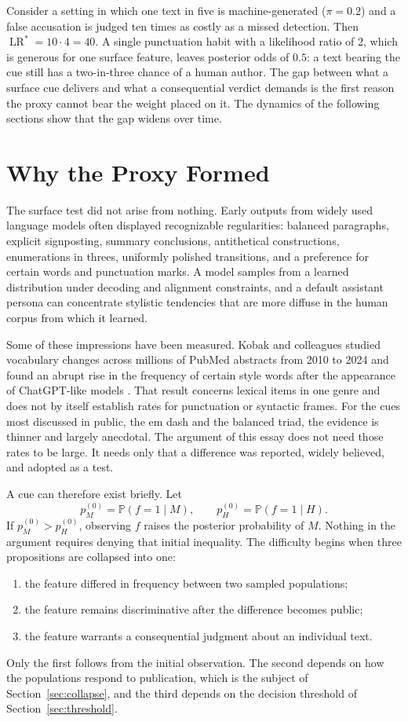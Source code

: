 \documentclass[11pt]{article}
\theoremstyle{plain}
\theoremstyle{definition}
\theoremstyle{remark}
\newcommand{\Pp}{\mathbb{P}}
\newcommand{\LR}{\operatorname{LR}}
\begin{document}
Consider a setting in which one text in five is machine-generated ($\pi=0.2$) and a false accusation is judged ten times as costly as a missed detection. Then $\LR^\ast = 10\cdot 4 = 40$. A single punctuation habit with a likelihood ratio of 2, which is generous for one surface feature, leaves posterior odds of $0.5$: a text bearing the cue still has a two-in-three chance of a human author. The gap between what a surface cue delivers and what a consequential verdict demands is the first reason the proxy cannot bear the weight placed on it. The dynamics of the following sections show that the gap widens over time.

\section{Why the Proxy Formed}

The surface test did not arise from nothing. Early outputs from widely used language models often displayed recognizable regularities: balanced paragraphs, explicit signposting, summary conclusions, antithetical constructions, enumerations in threes, uniformly polished transitions, and a preference for certain words and punctuation marks. A model samples from a learned distribution under decoding and alignment constraints, and a default assistant persona can concentrate stylistic tendencies that are more diffuse in the human corpus from which it learned.

Some of these impressions have been measured. Kobak and colleagues studied vocabulary changes across millions of PubMed abstracts from 2010 to 2024 and found an abrupt rise in the frequency of certain style words after the appearance of ChatGPT-like models \cite{kobak2025}. That result concerns lexical items in one genre and does not by itself establish rates for punctuation or syntactic frames. For the cues most discussed in public, the em dash and the balanced triad, the evidence is thinner and largely anecdotal. The argument of this essay does not need those rates to be large. It needs only that a difference was reported, widely believed, and adopted as a test.

A cue can therefore exist briefly. Let
\[
p_M^{(0)}=\Pp(f=1\mid M),
\qquad
p_H^{(0)}=\Pp(f=1\mid H).
\]
If $p_M^{(0)}>p_H^{(0)}$, observing $f$ raises the posterior probability of $M$. Nothing in the argument requires denying that initial inequality. The difficulty begins when three propositions are collapsed into one:
\begin{enumerate}[label=(\roman*),leftmargin=2.2em]
\item the feature differed in frequency between two sampled populations;
\item the feature remains discriminative after the difference becomes public;
\item the feature warrants a consequential judgment about an individual text.
\end{enumerate}
Only the first follows from the initial observation. The second depends on how the populations respond to publication, which is the subject of Section~\ref{sec:collapse}, and the third depends on the decision threshold of Section~\ref{sec:threshold}.
\end{document}
